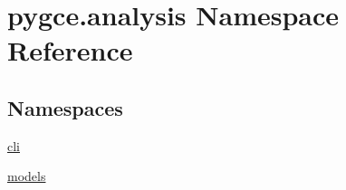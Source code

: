 \hypertarget{namespacepygce_1_1analysis}{}\section{pygce.\+analysis Namespace Reference}
\label{namespacepygce_1_1analysis}
\subsection*{Namespaces}
\begin{DoxyCompactItemize}
\item 
 \hyperlink{namespacepygce_1_1analysis_1_1cli}{cli}
\item 
 \hyperlink{namespacepygce_1_1analysis_1_1models}{models}
\end{DoxyCompactItemize}
